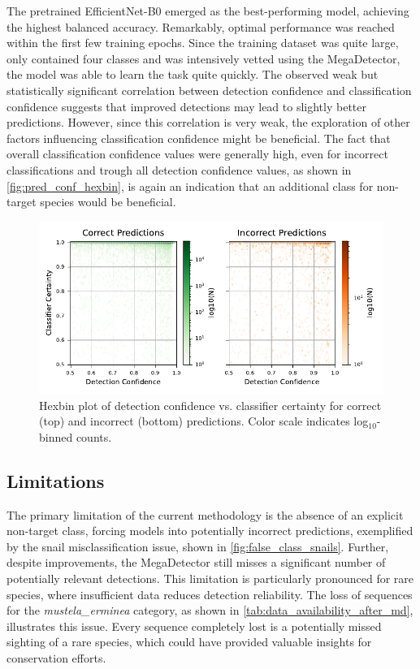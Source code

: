 The pretrained EfficientNet-B0 emerged as the best-performing model, achieving the highest balanced accuracy.
Remarkably, optimal performance was reached within the first few training epochs.
Since the training dataset was quite large, only contained four classes and was intensively vetted using the MegaDetector, the model was able to learn the task quite quickly.
The observed weak but statistically significant correlation between detection confidence and classification confidence suggests that improved detections may lead to slightly better predictions.
However, since this correlation is very weak, the exploration of other factors influencing classification confidence might be beneficial.
The fact that overall classification confidence values were generally high, even for incorrect classifications and trough all detection confidence values, as shown in \autoref{fig:pred_conf_hexbin}, is again an indication that an additional class for non-target species would be beneficial.

\begin{figure}[]
\centering
\includegraphics{figures/pred_conf_hexbin.pdf}
\caption{Hexbin plot of detection confidence vs. classifier certainty for correct (top) and incorrect (bottom) predictions. Color scale indicates log$_{10}$-binned counts.}
\label{fig:pred_conf_hexbin}
\end{figure}

\subsection{Limitations}

The primary limitation of the current methodology is the absence of an explicit non-target class, forcing models into potentially incorrect predictions, exemplified by the snail misclassification issue, shown in \autoref{fig:false_class_snails}.
Further, despite improvements, the MegaDetector still misses a significant number of potentially relevant detections.
This limitation is particularly pronounced for rare species, where insufficient data reduces detection reliability.
The loss of sequences for the \textit{mustela\_erminea} category, as shown in \autoref{tab:data_availability_after_md}, illustrates this issue.
Every sequence completely lost is a potentially missed sighting of a rare species, which could have provided valuable insights for conservation efforts.

